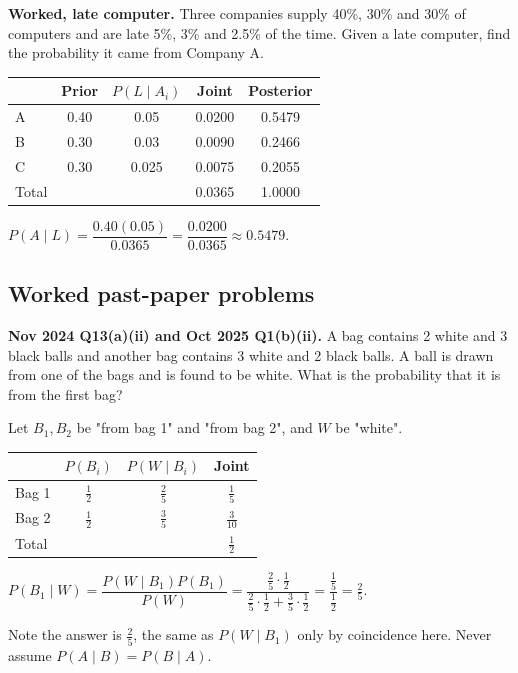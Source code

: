 \documentclass[11pt,a4paper]{article}
\begin{document}
\begin{exambox}
\textbf{Worked, late computer.} Three companies supply 40\%, 30\% and 30\% of computers and are late 5\%, 3\% and 2.5\% of the time. Given a late computer, find the probability it came from Company A.

\begin{center}\small
\begin{tabular}{lcccc}
\toprule & Prior & $P(L\mid A_i)$ & Joint & Posterior\\\midrule
A & 0.40 & 0.05 & 0.0200 & 0.5479\\
B & 0.30 & 0.03 & 0.0090 & 0.2466\\
C & 0.30 & 0.025 & 0.0075 & 0.2055\\\midrule
Total & & & 0.0365 & 1.0000\\\bottomrule
\end{tabular}
\end{center}
$P(A\mid L)=\dfrac{0.40(0.05)}{0.0365}=\dfrac{0.0200}{0.0365}\approx0.5479$.
\end{exambox}

\subsection{Worked past-paper problems}

\begin{pyqbox}
\textbf{Nov 2024 Q13(a)(ii) and Oct 2025 Q1(b)(ii).} A bag contains 2 white and 3 black balls and another bag contains 3 white and 2 black balls. A ball is drawn from one of the bags and is found to be white. What is the probability that it is from the first bag?
\end{pyqbox}

\begin{solbox}
Let $B_1,B_2$ be "from bag 1" and "from bag 2", and $W$ be "white".

\begin{center}\small
\begin{tabular}{lccc}
\toprule & $P(B_i)$ & $P(W\mid B_i)$ & Joint\\\midrule
Bag 1 & $\frac12$ & $\frac25$ & $\frac15$\\
Bag 2 & $\frac12$ & $\frac35$ & $\frac3{10}$\\\midrule
Total & & & $\frac12$\\\bottomrule
\end{tabular}
\end{center}

$P(B_1\mid W)=\dfrac{P(W\mid B_1)P(B_1)}{P(W)}=\dfrac{\frac25\cdot\frac12}{\frac25\cdot\frac12+\frac35\cdot\frac12}=\dfrac{\frac15}{\frac12}=\boxed{\frac25}$.

Note the answer is $\frac25$, the same as $P(W\mid B_1)$ only by coincidence here. Never assume $P(A\mid B)=P(B\mid A)$.
\end{solbox}
\end{document}
